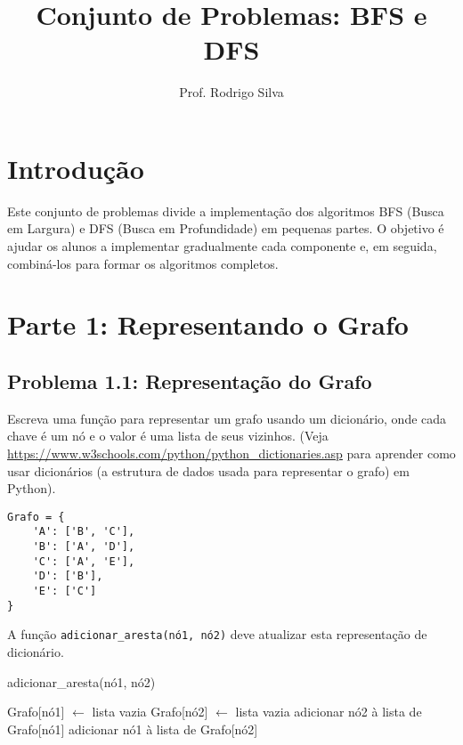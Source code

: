 \documentclass{article}
\title{Conjunto de Problemas: BFS e DFS}
\author{Prof. Rodrigo Silva}
\date{}
\begin{document}
\maketitle

\section*{Introdução}

Este conjunto de problemas divide a implementação dos algoritmos BFS (Busca em Largura) e DFS (Busca em Profundidade) em pequenas partes. O objetivo é ajudar os alunos a implementar gradualmente cada componente e, em seguida, combiná-los para formar os algoritmos completos.

\section*{Parte 1: Representando o Grafo}

\subsection*{Problema 1.1: Representação do Grafo}

Escreva uma função para representar um grafo usando um dicionário, onde cada chave é um nó e o valor é uma lista de seus vizinhos. (Veja \url{https://www.w3schools.com/python/python_dictionaries.asp} para aprender como usar dicionários (a estrutura de dados usada para representar o grafo) em Python).

\begin{verbatim}
Grafo = {
    'A': ['B', 'C'],
    'B': ['A', 'D'],
    'C': ['A', 'E'],
    'D': ['B'],
    'E': ['C']
}
\end{verbatim}

A função \texttt{adicionar\_aresta(nó1, nó2)} deve atualizar esta representação de dicionário.

\begin{algorithm}[H]
\caption{adicionar\_aresta(nó1, nó2)}
\begin{algorithmic}
        \STATE Grafo[nó1] $\gets$ lista vazia
    \ENDIF
        \STATE Grafo[nó2] $\gets$ lista vazia
    \ENDIF
    \STATE adicionar nó2 à lista de Grafo[nó1]
    \STATE adicionar nó1 à lista de Grafo[nó2] 
\end{algorithmic}
\end{algorithm}
\end{document}
